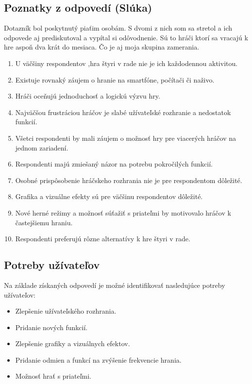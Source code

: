 \documentclass[a4paper, 11pt, onecolumn]{article}
\begin{document}
\subsection{Poznatky z odpovedí (Slúka)}
Dotazník bol poskytnutý piaťim osobám.
S dvomi z nich som sa stretol a ich odpovede aj prediskutoval a vypítal si odôvodnenie.
Sú to hráči ktorí sa vracajú k hre aspoň dva krát do mesiaca. Čo je aj moja skupina zamerania. 
\begin{enumerate}
    \item U väčšiny respondentov ,hra štyri v rade nie je ich každodennou aktivitou.
    \item Existuje rovnaký záujem o hranie na smartfóne, počítači či naživo.
    \item Hráči oceňujú jednoduchosť a logickú výzvu hry.
    \item Najväčšou frustráciou hráčov je slabé užívateľské rozhranie a nedostatok funkcií.
    \item Všetci respondenti by mali záujem o možnosť hry pre viacerých hráčov na jednom zariadení.
    \item Respondenti majú zmiešaný názor na potrebu pokročilých funkcií.
    \item Osobné prispôsobenie hráčskeho rozhrania nie je pre respondentom dôležité.
    \item Grafika a vizuálne efekty sú pre väčšinu respondentov dôležité.
    \item Nové herné režimy a možnosť súťažiť s priateľmi by motivovalo hráčov k častejšiemu hraniu.
    \item Respondenti preferujú rôzne alternatívy k hre štyri v rade.
\end{enumerate}
\subsection*{Potreby užívateľov}
Na základe získaných odpovedí je možné identifikovať nasledujúce potreby užívateľov:
\begin{itemize}
    \item Zlepšenie užívateľského rozhrania.
    \item Pridanie nových funkcií.
    \item Zlepšenie grafiky a vizuálnych efektov.
    \item Pridanie odmien a funkcí na zvýšenie frekvencie hrania.
    \item Možnosť hrať s priateľmi.
\end{itemize}
\end{document}
